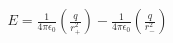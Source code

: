 \documentclass[preview]{standalone}
\begin{document}
\begin{align*}
E = \frac{1}{4\pi\epsilon _{0} }  \left ({ \frac{q}{r_{+}^{2}}} \right )  -  \frac{1}{4\pi\epsilon _{0} } \left ( {\frac{q}{r_{-}^{2}} }\right )
\end{align*}
\end{document}
